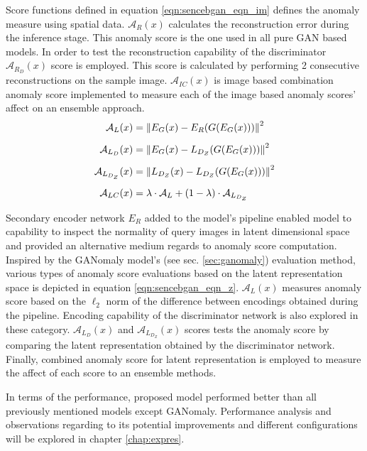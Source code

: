 Score functions defined in equation \ref{eqn:sencebgan_eqn_im} defines the anomaly measure using
spatial data. $\mathcal{A}_{R}(x)$ calculates the reconstruction error during the inference stage.
This anomaly score is the one used in all pure GAN based models. In order to test the reconstruction
capability of the discriminator $\mathcal{A}_{R_{D}}(x)$ score is employed. This score is calculated
by performing 2 consecutive reconstructions on the sample image. $\mathcal{A}_{IC}(x)$ is image
based combination anomaly score implemented to measure each of the image based anomaly scores'
affect on an ensemble approach.
\begin{equation}
	\label{eqn:sencebgan_eqn_z}
	\begin{aligned}
	\mathcal{A}_{L}(x) & = \left\lVert E_{G}(x) - E_{R}(G(E_{G}(x)))\right\rVert^2  \\[5pt]
	\mathcal{A}_{L_{D}}(x) & = \left\lVert E_{G}(x) - L_{D_{Z}}(G(E_{G}(x)))\right\rVert^2 \\[5pt]
	\mathcal{A}_{L_{D_{Z}}}(x) & = \left\lVert L_{D_{Z}}(x) - L_{D_{Z}}(G(E_{G}(x)))\right\rVert^2 \\[5pt]
	\mathcal{A}_{LC}(x) & = \lambda \cdot \mathcal{A}_{L} + (1 - \lambda) \cdot \mathcal{A}_{L_{D_{Z}}} 
	\end{aligned}
\end{equation}

Secondary encoder network $E_{R}$ added to the model's pipeline enabled model to capability to
inspect the normality of query images in latent dimensional space and provided an alternative medium
regards to anomaly score computation. Inspired by the GANomaly model's (see sec. \ref{sec:ganomaly})
evaluation method, various types of anomaly score evaluations based on the latent representation
space is depicted in equation \ref{eqn:sencebgan_eqn_z}. $\mathcal{A}_{L}(x)$ measures anomaly score
based on the $\ell_{2}$ norm of the difference between encodings obtained during the pipeline.
Encoding capability of the discriminator network is also explored in these category.
$\mathcal{A}_{L_{D}}(x)$ and $\mathcal{A}_{L_{D_{Z}}}(x)$ scores tests the anomaly score by
comparing the latent representation obtained by the discriminator network. Finally, combined anomaly
score for latent representation is employed to measure the affect of each score to an ensemble
methods. 
 
In terms of the performance, proposed model performed better than all previously mentioned models
except GANomaly. Performance analysis and observations regarding to its potential improvements and
different configurations will be explored in chapter \ref{chap:expres}.


\endgroup
